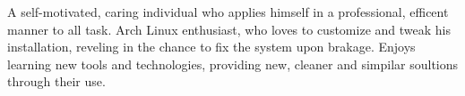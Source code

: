 

\begin{cvparagraph}

A self-motivated, caring individual who applies himself in a professional, efficent manner to all task. Arch Linux enthusiast, who loves to customize and tweak his installation, reveling in the chance to fix the system upon brakage. Enjoys learning new tools and technologies, providing new, cleaner and simpilar soultions through their use.
\end{cvparagraph}
